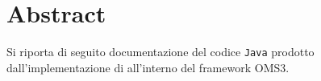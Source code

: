 \documentclass[
10pt, %
a4paper, %
oneside, %
headinclude,footinclude, %
BCOR5mm, %
]{scrartcl}
\begin{document}
\section*{Abstract} %

Si riporta di seguito documentazione del codice \texttt{Java} prodotto dall'implementazione
di \cite{Casulli2010} all'interno del framework OMS3. 


{\let\thefootnote\relax{}}
\end{document}
